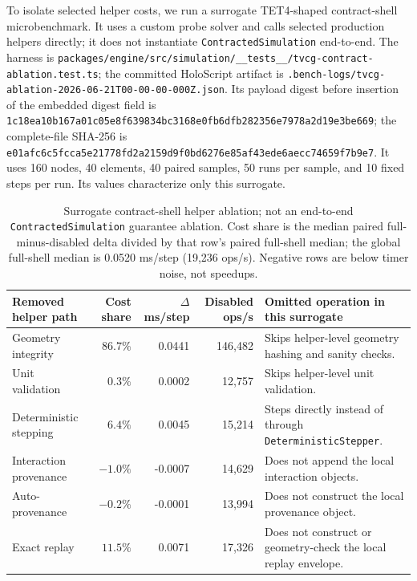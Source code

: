 \documentclass[journal]{IEEEtran}
\providecommand{\measuredFrom}[1]{}
\begin{document}
To isolate selected helper costs, we run a surrogate TET4-shaped contract-shell
microbenchmark. It uses a custom probe solver and calls selected production
helpers directly; it does not instantiate \texttt{ContractedSimulation}
end-to-end. The harness is
\texttt{packages/engine/src/simulation/\_\_tests\_\_/tvcg-contract-ablation.test.ts};
the committed HoloScript artifact is
\texttt{.bench-logs/tvcg-ablation-2026-06-21T00-00-00-000Z.json}. Its payload
digest before insertion of the embedded digest field is
\texttt{1c18ea10b167a01c05e8f639834bc3168e0fb6dfb282356e7978a2d19e3be669};
the complete-file SHA-256 is
\texttt{e01afc6c5fcca5e21778fd2a2159d9f0bd6276e85af43ede6aecc74659f7b9e7}.
It uses 160 nodes, 40 elements, 40 paired samples, 50 runs per sample, and 10 fixed steps per run. Its values characterize only this surrogate.
\begin{table}[t]\measuredFrom{HoloScript/.bench-logs/tvcg-ablation-2026-06-21T00-00-00-000Z.json}
  \centering
  \caption{Surrogate contract-shell helper ablation; not an end-to-end
    \texttt{ContractedSimulation} guarantee ablation. Cost share is the median paired full-minus-disabled delta
    divided by that row's paired full-shell median; the global full-shell
    median is 0.0520 ms/step (19,236 ops/s). Negative rows are below
    timer noise, not speedups.}
  \label{tab:ablation-tvcg}
  \begin{tabular}{@{}lrrrp{}@{}}
    \toprule
    Removed helper path & Cost share & $\Delta$ ms/step & Disabled ops/s & Omitted operation in this surrogate \\
    \midrule
    Geometry integrity & $86.7\%$ & 0.0441 & 146,482 & Skips helper-level geometry hashing and sanity checks. \\
    Unit validation & $0.3\%$ & 0.0002 & 12,757 & Skips helper-level unit validation. \\
    Deterministic stepping & $6.4\%$ & 0.0045 & 15,214 & Steps directly instead of through \texttt{DeterministicStepper}. \\
    Interaction provenance & $-1.0\%$ & -0.0007 & 14,629 & Does not append the local interaction objects. \\
    Auto-provenance & $-0.2\%$ & -0.0001 & 13,994 & Does not construct the local provenance object. \\
    Exact replay & $11.5\%$ & 0.0071 & 17,326 & Does not construct or geometry-check the local replay envelope. \\
    \bottomrule
  \end{tabular}
\end{table}
\end{document}
